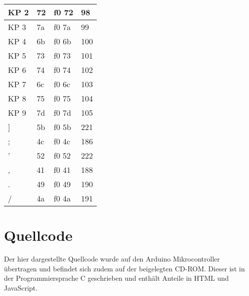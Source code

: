 \begin{longtable}{| p{} | p{} | p{} | p{} |}
  KP 2 & 72 & f0 72 & 98 \\ \hline
  KP 3 & 7a & f0 7a & 99 \\ \hline
  KP 4 & 6b & f0 6b & 100 \\ \hline
  KP 5 & 73 & f0 73 & 101 \\ \hline
  KP 6 & 74 & f0 74 & 102 \\ \hline
  KP 7 & 6c & f0 6c & 103 \\ \hline
  KP 8 & 75 & f0 75 & 104 \\ \hline
  KP 9 & 7d & f0 7d & 105 \\ \hline
  ] & 5b & f0 5b & 221 \\ \hline
  ; & 4c & f0 4c & 186 \\ \hline
  ' & 52 & f0 52 & 222 \\ \hline
  , & 41 & f0 41 & 188 \\ \hline
  . & 49 & f0 49 & 190 \\ \hline
  / & 4a & f0 4a & 191 \\ \hline
\end{longtable}



\thispagestyle{empty}
\cleardoublepage
\section{Quellcode}
\label{source_code}
Der hier dargestellte Quellcode \cite{badps2} wurde auf den Arduino Mikrocontroller übertragen und befindet sich zudem auf der beigelegten CD-ROM. Dieser ist in der Programmiersprache C geschrieben und enthält Anteile in HTML und JavaScript.

